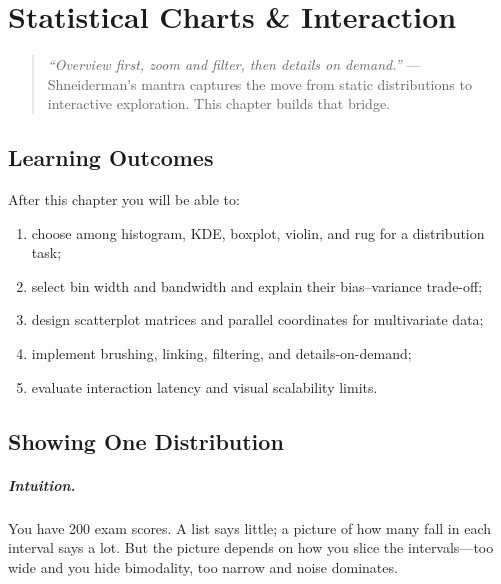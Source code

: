 \chapter{Statistical Charts \& Interaction}
\label{ch:statistical-interaction}
\sloppy

\begin{quote}
\emph{``Overview first, zoom and filter, then details on demand.''} --- Shneiderman's mantra captures the move from static distributions to interactive exploration. This chapter builds that bridge.
\end{quote}

\noindent{}
\vspace{0.4em}

\section*{Learning Outcomes}
After this chapter you will be able to:
\begin{enumerate}[label=(L\arabic*)]
    \item choose among histogram, KDE, boxplot, violin, and rug for a distribution task;
    \item select bin width and bandwidth and explain their bias--variance trade-off;
    \item design scatterplot matrices and parallel coordinates for multivariate data;
    \item implement brushing, linking, filtering, and details-on-demand;
    \item evaluate interaction latency and visual scalability limits.
\end{enumerate}

\section{Showing One Distribution}
\label{sec:one-dist}
\paragraph{Intuition.} You have 200 exam scores. A list says little; a picture of how many fall in each interval says a lot. But the picture depends on how you slice the intervals---too wide and you hide bimodality, too narrow and noise dominates.

